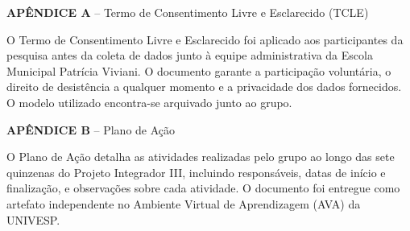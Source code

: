 
\noindent\textbf{APÊNDICE A} -- Termo de Consentimento Livre e Esclarecido (TCLE)

\vspace{\baselineskip}

O Termo de Consentimento Livre e Esclarecido foi aplicado aos participantes da pesquisa antes da coleta de dados junto à equipe administrativa da Escola Municipal Patrícia Viviani. O documento garante a participação voluntária, o direito de desistência a qualquer momento e a privacidade dos dados fornecidos. O modelo utilizado encontra-se arquivado junto ao grupo.

\vspace{2\baselineskip}

\noindent\textbf{APÊNDICE B} -- Plano de Ação

\vspace{\baselineskip}

O Plano de Ação detalha as atividades realizadas pelo grupo ao longo das sete quinzenas do Projeto Integrador III, incluindo responsáveis, datas de início e finalização, e observações sobre cada atividade. O documento foi entregue como artefato independente no Ambiente Virtual de Aprendizagem (AVA) da UNIVESP.
